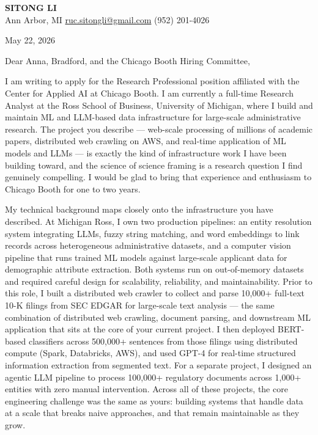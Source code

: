 \documentclass[12pt]{article}
\begin{document}
\begin{center}
  {\LARGE\textbf{\textcolor{accent}{SITONG LI}}} \\[4pt]
  \small Ann Arbor, MI
  \;\textbullet\;
  \href{mailto:ruc.sitongli@gmail.com}{ruc.sitongli@gmail.com}
  \;\textbullet\;
  (952) 201-4026
\end{center}

\vspace{1em}

\noindent May 22, 2026

\vspace{1em}

\noindent Dear Anna, Bradford, and the Chicago Booth Hiring Committee,

\vspace{1em}

I am writing to apply for the Research Professional position affiliated with the Center for Applied AI at Chicago Booth. I am currently a full-time Research Analyst at the Ross School of Business, University of Michigan, where I build and maintain ML and LLM-based data infrastructure for large-scale administrative research. The project you describe --- web-scale processing of millions of academic papers, distributed web crawling on AWS, and real-time application of ML models and LLMs --- is exactly the kind of infrastructure work I have been building toward, and the science of science framing is a research question I find genuinely compelling. I would be glad to bring that experience and enthusiasm to Chicago Booth for one to two years.

My technical background maps closely onto the infrastructure you have described. At Michigan Ross, I own two production pipelines: an entity resolution system integrating LLMs, fuzzy string matching, and word embeddings to link records across heterogeneous administrative datasets, and a computer vision pipeline that runs trained ML models against large-scale applicant data for demographic attribute extraction. Both systems run on out-of-memory datasets and required careful design for scalability, reliability, and maintainability. Prior to this role, I built a distributed web crawler to collect and parse 10,000+ full-text 10-K filings from SEC EDGAR for large-scale text analysis --- the same combination of distributed web crawling, document parsing, and downstream ML application that sits at the core of your current project. I then deployed BERT-based classifiers across 500,000+ sentences from those filings using distributed compute (Spark, Databricks, AWS), and used GPT-4 for real-time structured information extraction from segmented text. For a separate project, I designed an agentic LLM pipeline to process 100,000+ regulatory documents across 1,000+ entities with zero manual intervention. Across all of these projects, the core engineering challenge was the same as yours: building systems that handle data at a scale that breaks naive approaches, and that remain maintainable as they grow.
\end{document}
